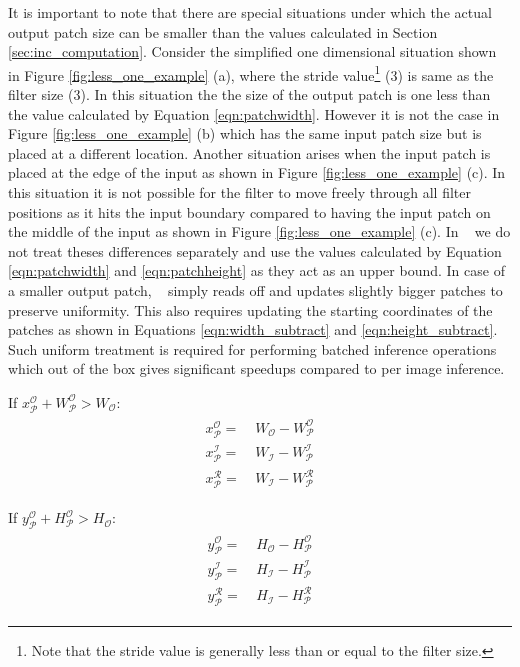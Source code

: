 It is important to note that there are special situations under which the actual output patch size can be smaller than the values calculated in Section \ref{sec:inc_computation}. Consider the simplified one dimensional situation shown in Figure \ref{fig:less_one_example} (a), where the stride value\footnote{Note that the stride value is generally less than or equal to the filter size.} (3) is same as the filter size (3). In this situation the the size of the output patch is one less than the value calculated by Equation \ref{eqn:patchwidth}. However it is not the case in Figure \ref{fig:less_one_example} (b) which has the same input patch size but is placed at a different location.
Another situation arises when the input patch is placed at the edge of the input as shown in Figure \ref{fig:less_one_example} (c). In this situation it is not possible for the filter to move freely through all filter positions as it hits the input boundary compared to having the input patch on the middle of the input as shown in Figure \ref{fig:less_one_example} (c).
In \system~ we do not treat theses differences separately and use the values calculated by Equation \ref{eqn:patchwidth} and \ref{eqn:patchheight} as they act as an upper bound. In case of a smaller output patch, \system~ simply reads off and updates slightly bigger patches to preserve uniformity.
This also requires updating the starting coordinates of the patches as shown in Equations \ref{eqn:width_subtract} and \ref{eqn:height_subtract}.
Such uniform treatment is required for performing batched inference operations which out of the box gives significant speedups compared to per image inference.

\vspace{2mm}
\hspace{4mm} If $x^\mathcal{O}_\mathcal{P} + W^\mathcal{O}_\mathcal{P} > W_{\mathcal{O}}:$
\begin{align}
\begin{split}
\label{eqn:width_subtract}
x^\mathcal{O}_\mathcal{P} = &~ W_{\mathcal{O}} - W^\mathcal{O}_\mathcal{P}\\
x^\mathcal{I}_\mathcal{P} = &~ W_{\mathcal{I}} - W^\mathcal{I}_\mathcal{P}\\
x^\mathcal{R}_\mathcal{P} = &~ W_{\mathcal{I}} - W^\mathcal{R}_\mathcal{P}
\end{split}
\end{align}

\hspace{4mm} If $y^\mathcal{O}_\mathcal{P} + H^\mathcal{O}_\mathcal{P} > H_{\mathcal{O}}:$
\begin{align}
\begin{split}
\label{eqn:height_subtract}
y^\mathcal{O}_\mathcal{P} = &~ H_{\mathcal{O}} - H^\mathcal{O}_\mathcal{P}\\
y^\mathcal{I}_\mathcal{P} = &~ H_{\mathcal{I}} - H^\mathcal{I}_\mathcal{P}\\
y^\mathcal{R}_\mathcal{P} = &~ H_{\mathcal{I}} - H^\mathcal{R}_\mathcal{P}
\end{split}
\end{align}

